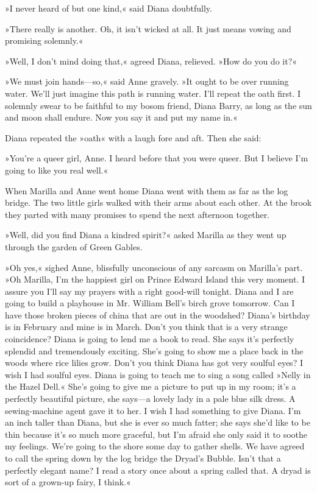»I never heard of but one kind,« said Diana doubtfully.

»There really is another. Oh, it isn’t wicked at all. It just means vowing and promising solemnly.«

»Well, I don’t mind doing that,« agreed Diana, relieved. »How do you do it?«

»We must join hands—so,« said Anne gravely. »It ought to be over running water. We’ll just imagine this path is running water. I’ll repeat the oath first. I solemnly swear to be faithful to my bosom friend, Diana Barry, as long as the sun and moon shall endure. Now you say it and put my name in.«

Diana repeated the »oath« with a laugh fore and aft. Then she said:

»You’re a queer girl, Anne. I heard before that you were queer. But I believe I’m going to like you real well.«

When Marilla and Anne went home Diana went with them as far as the log bridge. The two little girls walked with their arms about each other. At the brook they parted with many promises to spend the next afternoon together.

»Well, did you find Diana a kindred spirit?« asked Marilla as they went up through the garden of Green Gables.

»Oh yes,« sighed Anne, blissfully unconscious of any sarcasm on Marilla’s part. »Oh Marilla, I’m the happiest girl on Prince Edward Island this very moment. I assure you I’ll say my prayers with a right good-will tonight. Diana and I are going to build a playhouse in Mr. William Bell’s birch grove tomorrow. Can I have those broken pieces of china that are out in the woodshed? Diana’s birthday is in February and mine is in March. Don’t you think that is a very strange coincidence? Diana is going to lend me a book to read. She says it’s perfectly splendid and tremendously exciting. She’s going to show me a place back in the woods where rice lilies grow. Don’t you think Diana has got very soulful eyes? I wish I had soulful eyes. Diana is going to teach me to sing a song called »Nelly in the Hazel Dell.« She’s going to give me a picture to put up in my room; it’s a perfectly beautiful picture, she says—a lovely lady in a pale blue silk dress. A sewing-machine agent gave it to her. I wish I had something to give Diana. I’m an inch taller than Diana, but she is ever so much fatter; she says she’d like to be thin because it’s so much more graceful, but I’m afraid she only said it to soothe my feelings. We’re going to the shore some day to gather shells. We have agreed to call the spring down by the log bridge the Dryad’s Bubble. Isn’t that a perfectly elegant name? I read a story once about a spring called that. A dryad is sort of a grown-up fairy, I think.«

